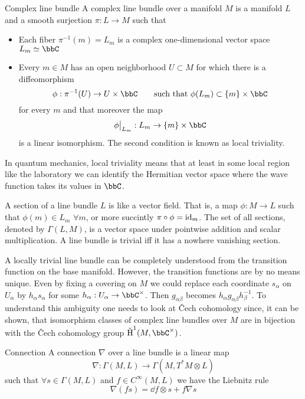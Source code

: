 \begin{defn}{Complex line bundle}{}
    A complex line bundle over a manifold $M$ is a manifold $L$ and a smooth surjection $\pi:L\rightarrow M$ such that
    \begin{itemize}
        \item Each fiber $\pi^{-1}(m)=L_m$ is a complex one-dimensional vector space $L_m\simeq \bbC$
        \item Every $m\in M$ has an open neighborhood $U\subset M$ for which there is a diffeomorphism 
        \begin{equation}
            \phi:\pi^{-1}(U)\rightarrow U\times \bbC\qquad\text{such that }\phi(L_m)\subset\{m\}\times\bbC
        \end{equation}
        for every $m$ and that moreover the map 
        \begin{equation}
            \phi\big|_{L_m}:L_m\rightarrow \{m\}\times \bbC
        \end{equation}
        is a linear isomorphism. The second condition is known as local triviality.
    \end{itemize}
\end{defn}
In quantum mechanics, local triviality means that at least in some local region like the laboratory we can identify the Hermitian vector space where the wave function takes its values in $\bbC$.

A section of a line bundle $L$ is like a vector field. That is, a map $\phi:M\rightarrow L$ such that $\phi(m)\in L_m$ $\forall m$, or more succintly $\pi\circ\phi=\rm{id}_m$. The set of all sections, denoted by $\Gamma(L,M)$, is a vector space under pointwise addition and scalar multiplication. A line bundle is trivial iff it has a nowhere vanishing section.

A locally trivial line bundle can be completely understood from the transition function on the base manifold. However, the transition functions are by no means unique. Even by fixing a covering on $M$ we could replace each coordinate $s_\alpha$ on $U_\alpha$ by $h_\alpha s_\alpha$ for some $h_\alpha:U_\alpha\rightarrow \bbC^\times$. Then $g_{\alpha \beta}$ becomes $h_\alpha g_{\alpha \beta }h_\beta^{-1}$. To understand this ambiguity one needs to look at Čech cohomology since, it can be shown, that isomorphism classes of complex line bundles over $M$ are in bijection with the Čech cohomology group $\check{\HH}^1(M,\bbC^\times)$.
\begin{defn}{Connection}{}
    A connection $\nabla$ over a line bundle is a linear map 
    \begin{equation}
        \nabla:\Gamma(M,L)\rightarrow \Gamma(M, T^* M\otimes L)
    \end{equation}
    such that $\forall s\in \Gamma(M,L)$ and $f\in C^\infty(M,L)$ we have the Liebnitz rule 
    \begin{equation}
        \nabla(fs)=\dd{f}\otimes s+f\nabla s
    \end{equation}
\end{defn}

